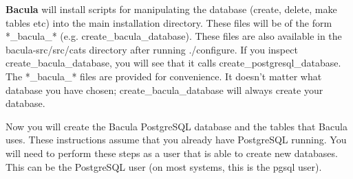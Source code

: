 {\bf Bacula} will install scripts for manipulating the database (create,
delete, make tables etc) into the main installation directory. These files
will be of the form *\_bacula\_* (e.g. create\_bacula\_database). These files
are also available in the \lt{}bacula-src\gt{}/src/cats directory after
running ./configure. If you inspect create\_bacula\_database, you will see
that it calls create\_postgresql\_database. The *\_bacula\_* files are
provided for convenience. It doesn't matter what database you have chosen;
create\_bacula\_database will always create your database. 

Now you will create the Bacula PostgreSQL database and the tables that Bacula
uses. These instructions assume that you already have PostgreSQL running. You
will need to perform these steps as a user that is able to create new
databases. This can be the PostgreSQL user (on most systems, this is the pgsql
user). 

